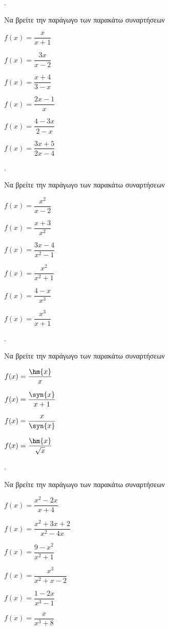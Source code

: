\documentclass[11pt,a4paper,twocolumn]{article}
\newcounter{askhsh}
\newcommand{\askhsh}{{\large\theaskhsh.}\ \addtocounter{askhsh}{1}}
\begin{document}
\askhsh Να βρείτε την παράγωγο των παρακάτω συναρτήσεων
\begin{multicols}{2}
\begin{alist}
\item $ f(x)=\dfrac{x}{x+1} $
\item $ f(x)=\dfrac{3x}{x-2} $
\item $ f(x)=\dfrac{x+4}{3-x} $
\item $ f(x)=\dfrac{2x-1}{x} $
\item $ f(x)=\dfrac{4-3x}{2-x} $
\item $ f(x)=\dfrac{3x+5}{2x-4} $
\end{alist}
\end{multicols}
\askhsh Να βρείτε την παράγωγο των παρακάτω συναρτήσεων
\begin{multicols}{2}
\begin{alist}
\item $ f(x)=\dfrac{x^2}{x-2} $
\item $ f(x)=\dfrac{x+3}{x^2} $
\item $ f(x)=\dfrac{3x-4}{x^2-1} $
\item $ f(x)=\dfrac{x^2}{x^2+1} $
\item $ f(x)=\dfrac{4-x}{x^3} $
\item $ f(x)=\dfrac{x^3}{x+1} $
\end{alist}
\end{multicols}
\askhsh Να βρείτε την παράγωγο των παρακάτω συναρτήσεων
\begin{multicols}{2}
\begin{alist}
\item $ f(x)=\dfrac{\hm{x}}{x} $
\item $ f(x)=\dfrac{\syn{x}}{x+1} $
\item $ f(x)=\dfrac{x}{\syn{x}} $
\item $ f(x)=\dfrac{\hm{x}}{\sqrt{x}} $
\end{alist}
\end{multicols}
\askhsh Να βρείτε την παράγωγο των παρακάτω συναρτήσεων
\begin{multicols}{2}
\begin{alist}
\item $ f(x)=\dfrac{x^2-2x}{x+4} $
\item $ f(x)=\dfrac{x^2+3x+2}{x^2-4x} $
\item $ f(x)=\dfrac{9-x^2}{x^2+1} $
\item $ f(x)=\dfrac{x^3}{x^2+x-2} $
\item $ f(x)=\dfrac{1-2x}{x^3-1} $
\item $ f(x)=\dfrac{x}{x^3+8} $
\end{alist}
\end{multicols}
\end{document}
